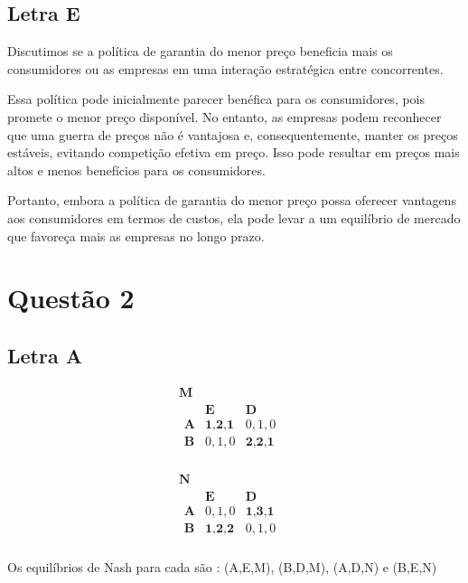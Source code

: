 \documentclass[12pt]{article}
\begin{document}
\subsection{\textbf{Letra E}}
Discutimos se a política de garantia do menor preço beneficia mais os consumidores ou as empresas em uma interação estratégica entre concorrentes.

Essa política pode inicialmente parecer benéfica para os consumidores, pois promete o menor preço disponível. No entanto, as empresas podem reconhecer que uma guerra de preços não é vantajosa e, consequentemente, manter os preços estáveis, evitando competição efetiva em preço. Isso pode resultar em preços mais altos e menos benefícios para os consumidores.

Portanto, embora a política de garantia do menor preço possa oferecer vantagens aos consumidores em termos de custos, ela pode levar a um equilíbrio de mercado que favoreça mais as empresas no longo prazo.


\section{\textbf{Questão 2}}
\subsection{\textbf{Letra A}}
\[
\begin{array}{cc}
\textbf{M} & \\
\begin{array}{c|cc}
 & \textbf{E} & \textbf{D} \\
\hline
\textbf{A} & \textbf{1,2,1} & 0,1,0 \\
\textbf{B} & 0,1,0 & \textbf{2,2,1} \\
\end{array}
\end{array}
\]


\[
\begin{array}{cc}
\textbf{N} & \\
\begin{array}{c|cc}
 & \textbf{E} & \textbf{D} \\
\hline
\textbf{A} & 0,1,0 & \textbf{1,3,1} \\
\textbf{B} & \textbf{1,2,2} & 0,1,0 \\
\end{array}
\end{array}
\]

Os equilíbrios de Nash para cada são : (A,E,M), (B,D,M), (A,D,N) e (B,E,N) 
\end{document}
